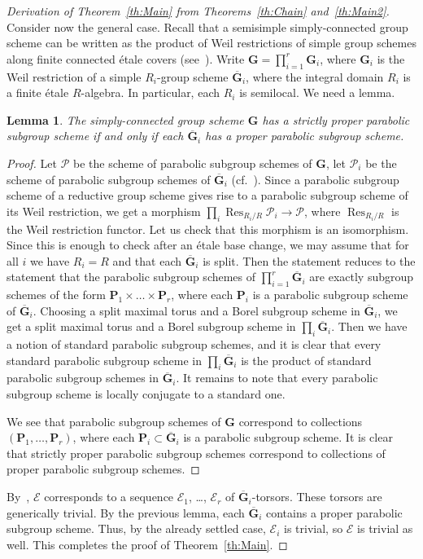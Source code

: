 \documentclass[11pt]{amsart}
\DeclareMathOperator{\Res}{Res}
\theoremstyle{plain}
\newtheorem{lemma}[proposition]{Lemma}
\theoremstyle{definition}
\theoremstyle{remark}
\newcommand\cE{{\mathcal{E}}}
\newcommand\cP{{\mathcal{P}}}
\newcommand\bG{{\mathbf G}}
\newcommand\bP{{\mathbf P}}
\begin{document}
\begin{proof}[Derivation of Theorem~\ref{th:Main} from Theorems~\ref{th:Chain} and~\ref{th:Main2}]
Consider now the general case. Recall that a semisimple simply-connected group scheme can be written as the product of Weil restrictions of simple group schemes along finite connected \'etale covers (see~\cite[exp.~XXIV, prop.~5.10]{SGA3-3}). Write $\bG=\prod_{i=1}^r\bG_i$, where $\bG_i$ is the Weil restriction of a simple $R_i$-group scheme $\overline\bG_i$, where the integral domain $R_i$ is a finite \'etale $R$-algebra. In particular, each $R_i$ is semilocal. We need a lemma.
\begin{lemma}\label{lm:TotallyIsotropic}
  The simply-connected group scheme $\bG$ has a strictly proper parabolic subgroup scheme if and only if each $\overline\bG_i$ has a proper parabolic subgroup scheme.
\end{lemma}
\begin{proof}
  Let $\cP$ be the scheme of parabolic subgroup schemes of $\bG$, let $\cP_i$ be the scheme of parabolic subgroup schemes of $\overline\bG_i$ (cf.~\cite[exp.~XXVI, cor.~3.5]{SGA3-3}). Since a parabolic subgroup scheme of a reductive group scheme gives rise to a parabolic subgroup scheme of its Weil restriction, we get a morphism $\prod_i\Res_{R_i/R}\cP_i\to\cP$, where $\Res_{R_i/R}$ is the Weil restriction functor. Let us check that this morphism is an isomorphism. Since this is enough to check after an \'etale base change, we may assume that for all $i$ we have $R_i=R$ and that each $\overline\bG_i$ is split. Then the statement reduces to the statement that the parabolic subgroup schemes of $\prod_{i=1}^r\overline\bG_i$ are exactly subgroup schemes of the form $\bP_1\times\ldots\times\bP_r$, where each $\bP_i$ is a parabolic subgroup scheme of $\overline\bG_i$. Choosing a split maximal torus and a Borel subgroup scheme in $\overline\bG_i$, we get a split maximal torus and a Borel subgroup scheme in $\prod_i\overline\bG_i$. Then we have a notion of standard parabolic subgroup schemes, and it is clear that every standard parabolic subgroup scheme in $\prod_i\overline\bG_i$ is the product of standard parabolic subgroup schemes in $\overline\bG_i$. It remains to note that every parabolic subgroup scheme is locally conjugate to a standard one.

  We see that parabolic subgroup schemes of $\bG$ correspond to collections $(\bP_1,\ldots,\bP_r)$, where each $\bP_i\subset\overline\bG_i$ is a parabolic subgroup scheme. It is clear that strictly proper parabolic subgroup schemes correspond to collections of proper parabolic subgroup schemes.
\end{proof}
By~\cite[exp.~XXIV, prop.~8.4]{SGA3-3}, $\cE$ corresponds to a sequence $\cE_1$, \ldots, $\cE_r$ of $\overline\bG_i$-torsors. These torsors are generically trivial. By the previous lemma, each $\overline\bG_i$ contains a proper parabolic subgroup scheme. Thus, by the already settled case, $\cE_i$ is trivial, so $\cE$ is trivial as well. This completes the proof of Theorem~\ref{th:Main}.
\end{proof}
\end{document}
